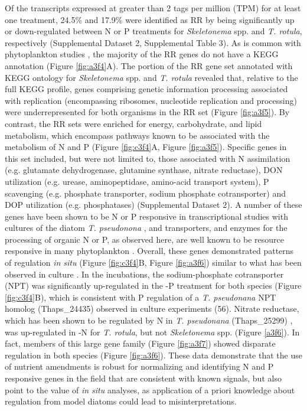 Of the transcripts expressed at greater than 2 tags per million (TPM) for at least one treatment, 24.5\% and 17.9\% were identified as RR by being significantly up or down-regulated between N or P treatments for \textit{Skeletonema} spp. and \textit{T. rotula}, respectively (Supplemental Dataset 2, Supplemental Table 3). As is common with phytoplankton studies \citep{Marchetti2012a}, the majority of the RR genes do not have a KEGG annotation (Figure \ref{fig:a3f4}A). The portion of the RR gene set annotated with KEGG ontology for \textit{Skeletonema} spp. and \textit{T. rotula} revealed that, relative to the full KEGG profile, genes comprising genetic information processing associated with replication (encompassing ribosomes, nucleotide replication and processing) were underrepresented for both organisms in the RR set (Figure \ref{fig:a3f5}). By contrast, the RR sets were enriched for energy, carbohydrate, and lipid metabolism, which encompass pathways known to be associated with the metabolism of N and P (Figure \ref{fig:c3f4}A, Figure \ref{fig:a3f5}). Specific genes in this set included, but were not limited to, those associated with N assimilation (e.g. glutamate dehydrogenase, glutamine synthase, nitrate reductase), DON utilization (e.g. urease, aminopeptidase, amino-acid transport system), P scavenging (e.g. phosphate transporter, sodium phosphate cotransporter) and DOP utilization (e.g. phosphatases) (Supplemental Dataset 2). A number of these genes have been shown to be N or P responsive in transcriptional studies with cultures of the diatom \textit{T. pseudonona} \citep{Dyhrman2012, Bender2014}, and transporters, and enzymes for the processing of organic N or P, as observed here, are well known to be resource responsive in many phytoplankton \citep{Dyhrman2012, Wurch2011, Dyhrman2006, Bruhn2010}. Overall, these genes demonstrated patterns of regulation \textit{in situ} (Figure \ref{fig:c3f4}B, Figure \ref{fig:a3f6}) similar to what has been observed in culture \citep{Dyhrman2012, Bender2014}. In the incubations, the sodium-phosphate cotransporter (NPT) was significantly up-regulated in the -P treatment for both species (Figure \ref{fig:c3f4}B), which is consistent with P regulation of a \textit{T. pseudonana} NPT homolog (Thaps\_24435) observed in culture experiments (56). Nitrate reductase, which has been shown to be regulated by N in \textit{T. pseudonana} (Thaps\_25299) \citep{Bender2012}, was up-regulated in -N for \textit{T. rotula}, but not \textit{Skeletonema} spp. (Figure \ref{a3f6}). In fact, members of this large gene family (Figure \ref{fig:a3f7}) showed disparate regulation in both species (Figure \ref{fig:a3f6}).  These data demonstrate that the use of nutrient amendments is robust for normalizing and identifying N and P responsive genes in the field that are consistent with known signals, but also point to the value of \textit{in situ} analyses, as application of a priori knowledge about regulation from model diatoms could lead to misinterpretations.\par

